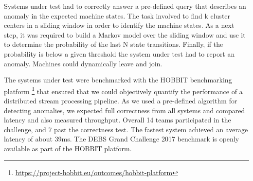 Systems under test had to correctly answer a pre-defined query that describes an anomaly in the expected machine states. The task involved to find k cluster centers in a sliding window in order to identify the machine states. As a next step, it was required to build a Markov model over the sliding window and use it to determine the probability of the last N state transitions. Finally, if the probability is below a given threshold the system under test had to report an anomaly. Machines could dynamically leave and join.

The systems under test were benchmarked with the HOBBIT benchmarking platform \footnote{\url{https://project-hobbit.eu/outcomes/hobbit-platform}} that ensured that we could objectively quantify the performance of a distributed stream processing pipeline. As we used a pre-defined algorithm for detecting anomalies, we expected full correctness from all systems and compared latency and also measured throughput. Overall 14 teams participated in the challenge,  and 7 past the correctness test. The fastest system \cite{amariei_et_al_2017} achieved an average latency of about 39ms. The DEBS Grand Challenge 2017 benchmark is openly available as part of the HOBBIT platform. 
